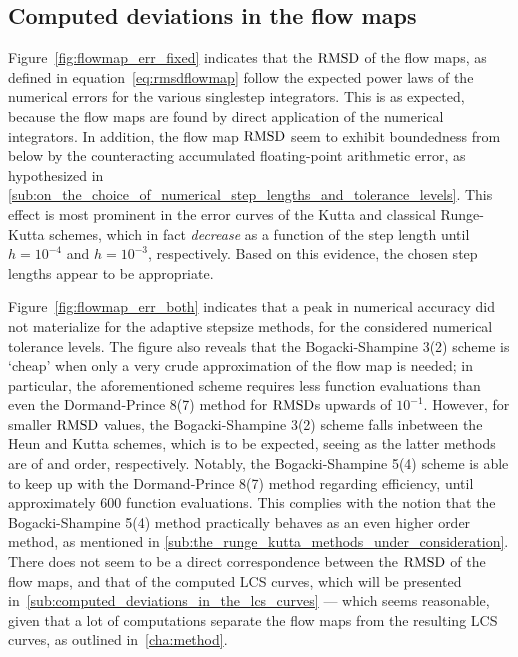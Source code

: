 \subsection{Computed deviations in the flow maps}
\label{sub:computed_deviations_in_the_flow_maps}
Figure~\ref{fig:flowmap_err_fixed} indicates that the $\operatorname{RMSD}$ of the flow maps,
as defined in equation~\eqref{eq:rmsdflowmap} follow the expected power laws
of the numerical errors for the various singlestep integrators. This is
as expected, because the flow maps are found by direct application of the
numerical integrators. In addition, the flow map $\operatorname{RMSD}$ seem to exhibit
boundedness from below by the counteracting accumulated floating-point
arithmetic error, as hypothesized in
\cref{sub:on_the_choice_of_numerical_step_lengths_and_tolerance_levels}.
This effect is most prominent in the error curves of the Kutta and
classical Runge-Kutta schemes, which in fact \emph{decrease} as a function
of the step length until $h=10^{-4}$ and $h=10^{-3}$, respectively. Based on
this evidence, the chosen step lengths appear to be appropriate.

Figure~\ref{fig:flowmap_err_both} indicates that a peak in numerical accuracy
did not materialize for the adaptive stepsize methods, for the considered
numerical tolerance levels. The figure also reveals that the Bogacki-Shampine
3(2) scheme is `cheap' when only a very crude approximation of the flow map is
needed; in particular, the aforementioned scheme requires less function
evaluations than even the Dormand-Prince 8(7) method for $\operatorname{RMSD}$s upwards of
$10^{-1}$. However, for smaller $\operatorname{RMSD}$ values, the Bogacki-Shampine 3(2)
scheme falls inbetween the Heun and Kutta schemes, which is to be expected,
seeing as the latter methods are of  and  order, respectively.
Notably, the Bogacki-Shampine 5(4) scheme is able to keep up with the
Dormand-Prince 8(7) method regarding efficiency, until approximately $600$
function evaluations. This complies with the notion that the Bogacki-Shampine
5(4) method practically behaves as an even higher order method, as mentioned in
\cref{sub:the_runge_kutta_methods_under_consideration}.
There does not seem to be a direct correspondence between the
$\operatorname{RMSD}$ of the flow maps, and that of the computed LCS curves, which will be
presented in~\cref{sub:computed_deviations_in_the_lcs_curves} --- which seems
reasonable, given that a lot of computations separate the flow maps from the
resulting LCS curves, as outlined in~\cref{cha:method}.




